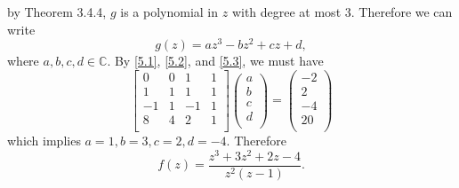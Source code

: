\documentclass[12pt]{article}
\begin{document}
by Theorem 3.4.4, $g$ is a polynomial in $z$ with degree at most $3$. Therefore we can write 
\[ g(z) = az^{3} - bz^{2} + cz + d, \]
where $a,b,c,d \in \mathbb{C}$. By \eqref{5.1}, \eqref{5.2}, and \eqref{5.3}, we must have 
\[
\begin{bmatrix}
0 & 0 & 1 & 1 \\
1 & 1 & 1 & 1 \\
-1 & 1 & -1 & 1 \\
8 & 4 & 2 & 1 \\
\end{bmatrix}\left( \begin{array}{c}
a \\
b \\ 
c \\
d \\
\end{array} \right) = \left( \begin{array}{r}
-2 \\
2 \\
-4 \\
20 \\
\end{array} \right)
\]
which implies $a = 1, b = 3, c = 2, d = -4$. Therefore 
\[ f(z) = \frac{z^{3} + 3z^{2} + 2z - 4}{z^{2}(z-1)}. \]


\newpage 
\end{document}
